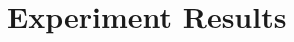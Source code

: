 \begingroup

\renewcommand{\arraystretch}{1}
\section{Experiment Results}
\label{sec:wing-experiment-results}


\endgroup
